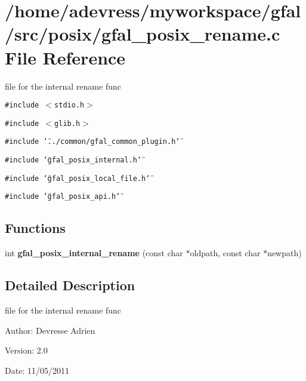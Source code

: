 \section{/home/adevress/myworkspace/gfal/src/posix/gfal\_\-posix\_\-rename.c File Reference}
\label{gfal__posix__rename_8c}
file for the internal rename func 

{\tt \#include $<$stdio.h$>$}\par
{\tt \#include $<$glib.h$>$}\par
{\tt \#include \char`\"{}../common/gfal\_\-common\_\-plugin.h\char`\"{}}\par
{\tt \#include \char`\"{}gfal\_\-posix\_\-internal.h\char`\"{}}\par
{\tt \#include \char`\"{}gfal\_\-posix\_\-local\_\-file.h\char`\"{}}\par
{\tt \#include \char`\"{}gfal\_\-posix\_\-api.h\char`\"{}}\par
\subsection*{Functions}
\begin{CompactItemize}
\item 
int \textbf{gfal\_\-posix\_\-internal\_\-rename} (const char $\ast$oldpath, const char $\ast$newpath)\label{gfal__posix__rename_8c_a9886d08766043a3fc98454d669b592e}

\end{CompactItemize}


\subsection{Detailed Description}
file for the internal rename func 

\begin{Desc}
\item[Author:]Devresse Adrien \end{Desc}
\begin{Desc}
\item[Version:]2.0 \end{Desc}
\begin{Desc}
\item[Date:]11/05/2011 \end{Desc}
